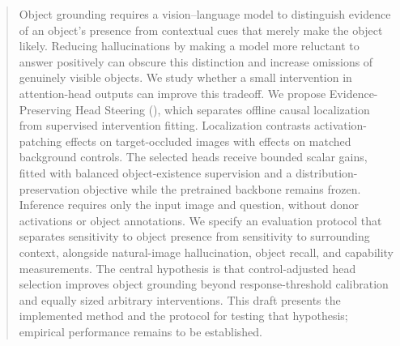 \begin{abstract}
Object grounding requires a vision--language model to distinguish evidence of
an object's presence from contextual cues that merely make the object likely.
Reducing hallucinations by making a model more reluctant to answer positively
can obscure this distinction and increase omissions of genuinely visible
objects. We study whether a small intervention in attention-head outputs can
improve this tradeoff. We propose Evidence-Preserving Head Steering
(\method), which separates offline causal localization from supervised
intervention fitting. Localization contrasts activation-patching effects on
target-occluded images with effects on matched background controls. The
selected heads receive bounded scalar gains, fitted with balanced
object-existence supervision and a distribution-preservation objective while
the pretrained backbone remains frozen. Inference requires only the input
image and question, without donor activations or object annotations. We
specify an evaluation protocol that separates sensitivity to object presence
from sensitivity to surrounding context, alongside natural-image
hallucination, object recall, and capability measurements. The central
hypothesis is that control-adjusted head selection improves object grounding
beyond response-threshold calibration and equally sized arbitrary
interventions. This draft presents the implemented method and the protocol
for testing that hypothesis; empirical performance remains to be established.
\end{abstract}
